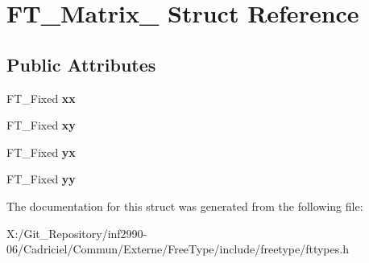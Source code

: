 \hypertarget{struct_f_t___matrix__}{\section{F\-T\-\_\-\-Matrix\-\_\- Struct Reference}
\label{struct_f_t___matrix__}
}
\subsection*{Public Attributes}
\begin{DoxyCompactItemize}
\item 
\hypertarget{struct_f_t___matrix___a27d51c2958634abe7bf377610e095f74}{F\-T\-\_\-\-Fixed {\bfseries xx}}\label{struct_f_t___matrix___a27d51c2958634abe7bf377610e095f74}

\item 
\hypertarget{struct_f_t___matrix___a7e9f439d37c00ba1a11919bcaa8937a2}{F\-T\-\_\-\-Fixed {\bfseries xy}}\label{struct_f_t___matrix___a7e9f439d37c00ba1a11919bcaa8937a2}

\item 
\hypertarget{struct_f_t___matrix___a55792583a843a1611b43c40534a02a17}{F\-T\-\_\-\-Fixed {\bfseries yx}}\label{struct_f_t___matrix___a55792583a843a1611b43c40534a02a17}

\item 
\hypertarget{struct_f_t___matrix___a689a6fd20a88238788b90c3597ee0c2a}{F\-T\-\_\-\-Fixed {\bfseries yy}}\label{struct_f_t___matrix___a689a6fd20a88238788b90c3597ee0c2a}

\end{DoxyCompactItemize}


The documentation for this struct was generated from the following file\-:\begin{DoxyCompactItemize}
\item 
X\-:/\-Git\-\_\-\-Repository/inf2990-\/06/\-Cadriciel/\-Commun/\-Externe/\-Free\-Type/include/freetype/fttypes.\-h\end{DoxyCompactItemize}
